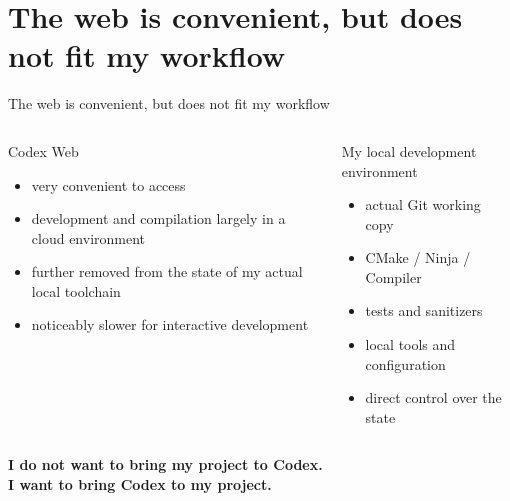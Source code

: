 \documentclass[\fhformat,10pt]{fh-ooe}
\begin{document}
\section{The web is convenient, but does not fit my workflow}
\begin{frame}{The web is convenient, but does not fit my workflow}
\begin{columns}[T]
\begin{block}{Codex Web}
\begin{itemize}
  \item very convenient to access
  \item development and compilation largely in a cloud environment
  \item further removed from the state of my actual local toolchain
  \item noticeably slower for interactive development
\end{itemize}
\end{block}
\begin{block}{My local development environment}
\begin{itemize}
  \item actual Git working copy
  \item CMake / Ninja / Compiler
  \item tests and sanitizers
  \item local tools and configuration
  \item direct control over the state
\end{itemize}
\end{block}
\end{columns}
\vspace{0.55em}
\begin{center}
\Large
\textbf{I do not want to bring my project to Codex.}\\[0.25em]
\color{fh-ooe-red}\textbf{I want to bring Codex to my project.}
\end{center}
\end{frame}

\end{document}
